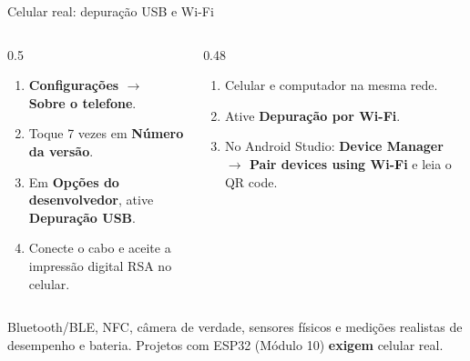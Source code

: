 \documentclass[aspectratio=169,10pt]{beamer}
\begin{document}
\begin{frame}{Celular real: depuração USB e Wi-Fi}
  \begin{columns}[T]
    \begin{column}{0.5\textwidth}
      \begin{conceito}
        \begin{enumerate}
          \item \textbf{Configurações $\rightarrow$ Sobre o telefone}.
          \item Toque 7 vezes em \textbf{Número da versão}.
          \item Em \textbf{Opções do desenvolvedor}, ative \textbf{Depuração USB}.
          \item Conecte o cabo e aceite a impressão digital RSA no celular.
        \end{enumerate}
      \end{conceito}
    \end{column}
    \begin{column}{0.48\textwidth}
      \begin{conceito}
        \begin{enumerate}
          \item Celular e computador na mesma rede.
          \item Ative \textbf{Depuração por Wi-Fi}.
          \item No Android Studio: \textbf{Device Manager $\rightarrow$ Pair devices using Wi-Fi} e leia o QR code.
        \end{enumerate}
      \end{conceito}
    \end{column}
  \end{columns}
  \begin{atencao}
    Bluetooth/BLE, NFC, câmera de verdade, sensores físicos e medições realistas de desempenho e bateria. Projetos com ESP32 (Módulo 10) \textbf{exigem} celular real.
  \end{atencao}
\end{frame}
\end{document}
